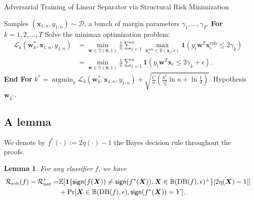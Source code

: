 \documentclass[11pt]{article}
\newcommand{\sign}{\textup{\textsf{sign}}}
\newcommand{\adv}{\mathrm{rob}}
\newcommand{\nat}{\mathrm{nat}}
\newcommand{\boundary}{\mathrm{DB}}
\newtheorem{lemma}[theorem]{Lemma}
\newcommand{\w}{\bm{w}}
\newcommand{\x}{\bm{x}}
\newcommand{\X}{\bm{X}}
\newcommand{\0}{\mathbf{0}}
\newcommand{\1}{\mathbf{1}}
\newcommand{\cD}{\mathcal{D}}
\newcommand{\cL}{\mathcal{L}}
\newcommand{\cR}{\mathcal{R}}
\newcommand{\bbB}{\mathbb{B}}
\newcommand{\bbE}{\mathbb{E}}
\newcommand{\bbS}{\mathbb{S}}
\DeclareMathOperator*{\argmin}{argmin}
\begin{document}
\begin{algorithm}[ht]
\caption{Adversarial Training of Linear Separator via Structural Risk Minimization}
\begin{algorithmic}
\label{algorithm: adversarial training of linear separator via structural risk minimization}
 Samples $(\x_{1:n},y_{1:n})\sim\cD$, a bunch of margin parameters $\gamma_1,...,\gamma_T$.
 \textbf{For} $k=1,2,...,T$
 \quad Solve the minimax optimization problem:
\begin{equation*}
\begin{split}
\cL_k(\w_k^*,\x_{1:n},y_{1:n})&=\min_{\w\in\bbS(\0,1)} \frac{1}{n}\sum_{i=1}^n \max_{\x_i^\adv\in\bbB(\x_i,\epsilon)}\1(y_i\w^T\x_i^\adv\le2\gamma_k)\\
&=\min_{\w\in\bbS(\0,1)} \frac{1}{n}\sum_{i=1}^n \1(y_i\w^T\x_i\le2\gamma_k+\epsilon).
\end{split}
\end{equation*}
 \textbf{End For}
 $k^*=\argmin_{k} \cL_k(\w_k^*,\x_{1:n},y_{1:n})+\sqrt{\frac{C}{n}\left(\frac{b^2}{\gamma_k^2}\ln n+\ln\frac{1}{\delta}\right)}$.
 Hypothesis $\w_{k^*}$.
\end{algorithmic}
\end{algorithm}



\subsection{A lemma}

We denote by $f^*(\cdot):=2\eta(\cdot)-1$ the Bayes decision rule throughout the proofs.

\begin{lemma}
\label{lemma: risk equality}
For any classifier $f$, we have
\begin{equation*}
\begin{split}
\cR_\adv(f)-\cR_\nat^*=&\bbE[\1\{\sign(f(\X))\not=\sign(f^*(\X)),\X\in\bbB(\boundary(f),\epsilon)^\perp\}|2\eta(\X)-1|]\\
&+\Pr[\X\in \bbB(\boundary(f),\epsilon),\sign(f^*(\X))=Y].
\end{split}
\end{equation*}
\end{lemma}
\end{document}
